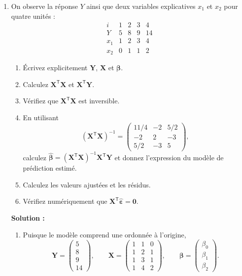 \documentclass[letter, 11pt]{article}
\newcommand{\bY}{\mathbf{Y}}
\newcommand{\bX}{\mathbf{X}}
\newcommand{\bbeta}{\boldsymbol{\beta}}
\newcommand{\bepsilon}{\boldsymbol{\varepsilon}}
\newcommand{\trans}{^{\mathsf T}}
\newcommand{\prof}[1]{\ifdefined\avecsolutions\par{\color{blue}\textbf{Solution :} #1}\par\fi}
\begin{document}
\begin{enumerate}[leftmargin=*, wide, label=\bf Exercice \arabic*:]

\item On observe la réponse $Y$ ainsi que deux variables explicatives $x_1$ et $x_2$
pour quatre unités :
\[
\begin{array}{c|rrrr}
  i   & 1 & 2 & 3 & 4\\ \hline
  Y   & 5 & 8 & 9 & 14\\
  x_1 & 1 & 2 & 3 & 4\\
  x_2 & 0 & 1 & 1 & 2
\end{array}
\]

\begin{enumerate}[label=\alph*)]
  \item Écrivez explicitement $\bY$, $\bX$ et $\bbeta$.
  \item Calculez $\bX\trans\bX$ et $\bX\trans\bY$.
  \item Vérifiez que $\bX\trans\bX$ est inversible.
  \item En utilisant 
        \[
        (\bX\trans\bX)^{-1}=
        \begin{pmatrix}
          11/4&-2&5/2\\
          -2&2&-3\\
          5/2&-3&5
        \end{pmatrix},
        \] calculez $\widehat{\bbeta}=(\bX\trans\bX)^{-1}\bX\trans\bY$ et donnez l'expression du modèle de prédiction estimé.
  \item Calculez les valeurs ajustées et les résidus.
  \item Vérifiez numériquement que $\bX\trans\widehat{\bepsilon}=\mathbf{0}$.
\end{enumerate}

\prof{
\begin{enumerate}[label=\alph*)]
  \item Puisque le modèle comprend une ordonnée à l'origine,
        \[
        \bY=\begin{pmatrix}5\\8\\9\\14\end{pmatrix},\qquad
        \bX=\begin{pmatrix}
          1&1&0\\
          1&2&1\\
          1&3&1\\
          1&4&2
        \end{pmatrix},\qquad
        \bbeta=\begin{pmatrix}\beta_0\\\beta_1\\\beta_2\end{pmatrix}.
        \]


\end{enumerate}}
\end{enumerate}
\end{document}
